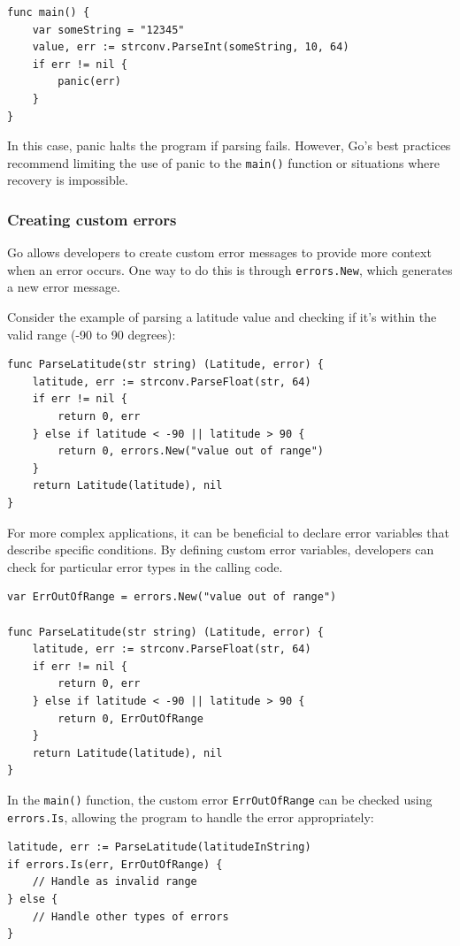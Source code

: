 \begin{verbatim}
func main() {
    var someString = "12345"
    value, err := strconv.ParseInt(someString, 10, 64)
    if err != nil {
        panic(err)
    }
}
\end{verbatim}
In this case, panic halts the program if parsing fails. However, Go’s best practices recommend limiting the use of panic to the \texttt{main()} function or situations where recovery is impossible.

\subsubsection{Creating custom errors}
Go allows developers to create custom error messages to provide more context when an error occurs. One way to do this is through \texttt{errors.New}, which generates a new error message.

Consider the example of parsing a latitude value and checking if it’s within the valid range (-90 to 90 degrees):

\begin{verbatim}
func ParseLatitude(str string) (Latitude, error) {
    latitude, err := strconv.ParseFloat(str, 64)
    if err != nil {
        return 0, err
    } else if latitude < -90 || latitude > 90 {
        return 0, errors.New("value out of range")
    }
    return Latitude(latitude), nil
}
\end{verbatim}

For more complex applications, it can be beneficial to declare error variables that describe specific conditions. By defining custom error variables, developers can check for particular error types in the calling code.

\begin{verbatim}
var ErrOutOfRange = errors.New("value out of range")

func ParseLatitude(str string) (Latitude, error) {
    latitude, err := strconv.ParseFloat(str, 64)
    if err != nil {
        return 0, err
    } else if latitude < -90 || latitude > 90 {
        return 0, ErrOutOfRange
    }
    return Latitude(latitude), nil
}
\end{verbatim}
In the \texttt{main()} function, the custom error \texttt{ErrOutOfRange} can be checked using \texttt{errors.Is}, allowing the program to handle the error appropriately:

\begin{verbatim}
latitude, err := ParseLatitude(latitudeInString)
if errors.Is(err, ErrOutOfRange) {
    // Handle as invalid range
} else {
    // Handle other types of errors
}
\end{verbatim}

